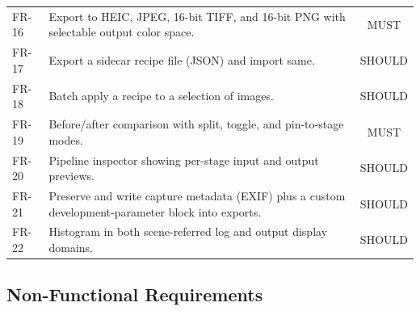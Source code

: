 \begin{table}[htbp]
\begin{center}
\begin{tabularx}{\columnwidth}{@{}l>{\raggedright\arraybackslash}X c@{}}
FR-16 & Export to HEIC, JPEG, 16-bit TIFF, and 16-bit PNG with selectable output color space. & MUST \\
FR-17 & Export a sidecar recipe file (JSON) and import same. & SHOULD \\
FR-18 & Batch apply a recipe to a selection of images. & SHOULD \\
FR-19 & Before/after comparison with split, toggle, and pin-to-stage modes. & MUST \\
FR-20 & Pipeline inspector showing per-stage input and output previews. & SHOULD \\
FR-21 & Preserve and write capture metadata (EXIF) plus a custom development-parameter block into exports. & SHOULD \\
FR-22 & Histogram in both scene-referred log and output display domains. & SHOULD \\
\bottomrule
\end{tabularx}
\end{center}
\end{table}

\subsection{Non-Functional Requirements}

